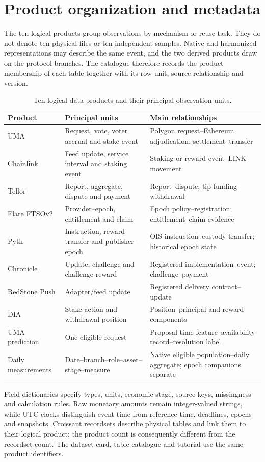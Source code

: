\section{Product organization and metadata}
\label{app:products}

The ten logical products group observations by mechanism or reuse task. They do not denote ten physical files or ten independent samples. Native and harmonized representations may describe the same event, and the two derived products draw on the protocol branches. The catalogue therefore records the product membership of each table together with its row unit, source relationship and version.

\begin{table}[!htbp]
\centering\tabstyle
\caption{Ten logical data products and their principal observation units.}
\label{tab:logical_products}
\begin{tabularx}{\linewidth}{@{}L{.19\linewidth}Y Y@{}}
\toprule Product & Principal units & Main relationships \\ \midrule
UMA & Request, vote, voter accrual and stake event & Polygon request--Ethereum adjudication; settlement--transfer \\
Chainlink & Feed update, service interval and staking event & Staking or reward event--LINK movement \\
Tellor & Report, aggregate, dispute and payment & Report--dispute; tip funding--withdrawal \\
Flare FTSOv2 & Provider--epoch, entitlement and claim & Epoch policy--registration; entitlement--claim evidence \\
Pyth & Instruction, reward transfer and publisher--epoch & OIS instruction--custody transfer; historical epoch state \\
Chronicle & Update, challenge and challenge reward & Registered implementation--event; challenge--payment \\
RedStone Push & Adapter/feed update & Registered delivery contract--update \\
DIA & Stake action and withdrawal position & Position--principal and reward components \\
UMA prediction & One eligible request & Proposal-time feature--availability record--resolution label \\
Daily measurements & Date--branch--role--asset--stage--measure & Native eligible population--daily aggregate; epoch companions separate \\
\bottomrule
\end{tabularx}
\end{table}

Field dictionaries specify types, units, economic stage, source keys, missingness and calculation rules. Raw monetary amounts remain integer-valued strings, while UTC clocks distinguish event time from reference time, deadlines, epochs and snapshots. Croissant recordsets describe physical tables and link them to their logical product; the product count is consequently different from the recordset count. The dataset card, table catalogue and tutorial use the same product identifiers.
